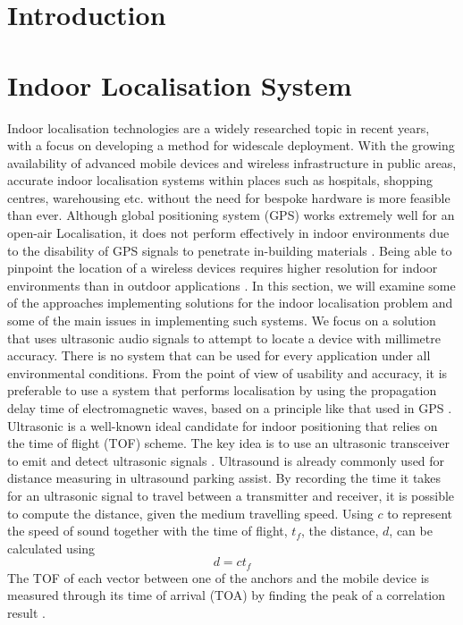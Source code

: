 \documentclass[]{final_report}
\begin{document}
\chapter{Introduction}



\chapter{\label{chapter2} Indoor Localisation System}

Indoor localisation technologies are a widely researched topic in recent years, with a focus on developing a method for widescale deployment. With the growing availability of advanced mobile devices and wireless infrastructure in public areas, accurate indoor localisation systems within places such as hospitals, shopping centres, warehousing etc. without the need for bespoke hardware is more feasible than ever. Although global positioning system (GPS) works extremely well for an open-air Localisation, it does not perform effectively in indoor environments due to the disability of GPS signals to penetrate in-building materials \cite{wu2013csi}.  Being able to pinpoint the location of a wireless devices requires higher resolution for indoor environments than in outdoor applications \cite{xiao2016survey}. In this section, we will examine some of the approaches implementing solutions for the indoor localisation problem and some of the main issues in implementing such systems. We focus on a solution that uses ultrasonic audio signals to attempt to locate a device with millimetre accuracy. There is no system that can be used for every application under all environmental conditions. From the point of view of usability and accuracy, it is preferable to use a system that performs localisation by using the propagation delay time of electromagnetic waves, based on a principle like that used in GPS \cite{minami2007design}.
Ultrasonic is a well-known ideal candidate for indoor positioning that relies on the time of flight (TOF) scheme. The key idea is to use an ultrasonic transceiver to emit and detect ultrasonic signals \cite{piontek2007improving}. Ultrasound is already commonly used for distance measuring in ultrasound parking assist. By recording the time it takes for an ultrasonic signal to travel between a transmitter and receiver, it is possible to compute the distance, given the medium travelling speed. Using $c$ to represent the speed of sound together with the time of flight, $t_{f}$, the distance, $d$, can be calculated using \[ d=ct_{f} \]
The TOF of each vector between one of the anchors and the mobile device is measured through its time of arrival (TOA) by finding the peak of a correlation result \cite{moutinho2016indoor}.
\end{document}
